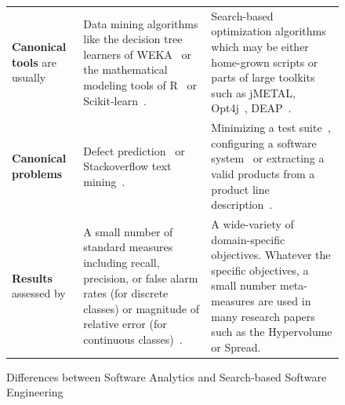 \documentclass[sigconf,anonymous,review]{acmart}
\begin{document}
\begin{figure}[t]
\begin{tabular}{@{}p{3cm}p{6cm}p{8.35cm}@{}}
                 \rowcolor{gray!30}\textbf{Canonical   tools} are usually
                &
                Data mining algorithms like  the decision
                tree learners of WEKA~\cite{hall2009weka} or the mathematical modeling tools of R~\cite{rmanual18} or Scikit-learn~\cite{scikit-learn}.
                &
                {Search-based} optimization algorithms which may be either home-grown scripts or parts of large toolkits such as jMETAL\cite{refs2jmetalDEE}, Opt4j~\cite{opt4jpaper}, DEAP~\cite{DEAP_JMLR2012}.
                \\ 
                \textbf{Canonical   problems}
                &
                Defect prediction~\cite{lessmann2008benchmarking}   or Stackoverflow text mining~\cite{fu2017easy}. 
                &
                Minimizing a test suite~\cite{fraser2007redundancy}, configuring a software system~\cite{nair2017faster} or extracting a valid products from a product line description~\cite{sayyad13b}.
                \\ 
                
                 \rowcolor{gray!30} \textbf{Results}   assessed by
                &
                A small number of standard measures
                including   recall, precision, or false alarm rates (for discrete classes)
                or magnitude of relative error (for continuous classes)~\cite{Shepperd2012}.
                &
                A wide-variety of domain-specific objectives.
                Whatever the specific objectives, a small number meta-measures are used in many research papers such as the Hypervolume or Spread. 
    \end{tabular}
    \caption{Differences between Software Analytics and Search-based Software Engineering}
    \label{fig:diff}
\end{figure}
\end{document}
